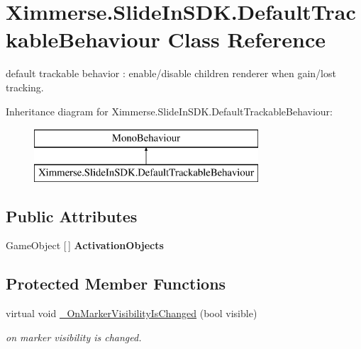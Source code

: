 \hypertarget{class_ximmerse_1_1_slide_in_s_d_k_1_1_default_trackable_behaviour}{}\section{Ximmerse.\+Slide\+In\+S\+D\+K.\+Default\+Trackable\+Behaviour Class Reference}
\label{class_ximmerse_1_1_slide_in_s_d_k_1_1_default_trackable_behaviour}


default trackable behavior \+: enable/disable children renderer when gain/lost tracking.  


Inheritance diagram for Ximmerse.\+Slide\+In\+S\+D\+K.\+Default\+Trackable\+Behaviour\+:\begin{figure}[H]
\begin{center}
\leavevmode
\includegraphics[height=2.000000cm]{class_ximmerse_1_1_slide_in_s_d_k_1_1_default_trackable_behaviour}
\end{center}
\end{figure}
\subsection*{Public Attributes}
\begin{DoxyCompactItemize}
\item 
\mbox{\label{class_ximmerse_1_1_slide_in_s_d_k_1_1_default_trackable_behaviour_a00b145034295ae87e55b53f2c5b47674}} 
Game\+Object \mbox{[}$\,$\mbox{]} {\bfseries Activation\+Objects}
\end{DoxyCompactItemize}
\subsection*{Protected Member Functions}
\begin{DoxyCompactItemize}
\item 
virtual void \mbox{\hyperlink{class_ximmerse_1_1_slide_in_s_d_k_1_1_default_trackable_behaviour_afeb5308ac6e873395cfeced2903f0547}{\+\_\+\+On\+Marker\+Visibility\+Is\+Changed}} (bool visible)
\begin{DoxyCompactList}\small\item\em on marker visibility is changed. \end{DoxyCompactList}\end{DoxyCompactItemize}



